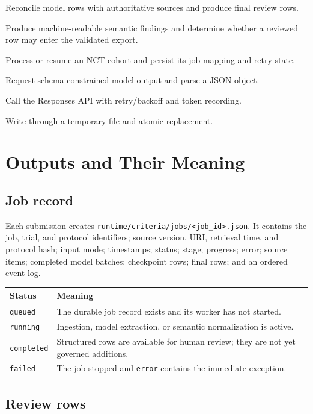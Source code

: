 \documentclass[11pt]{article}
\newcommand{\code}[1]{\nolinkurl{#1}}
\newcommand{\fn}[2]{\item[\code{#1}] #2}
\begin{document}
\begin{description}[style=nextline]
  \fn{normalize_rows()}{Reconcile model rows with authoritative sources and produce final review rows.}
  \fn{validate_criterion() / readiness()}{Produce machine-readable semantic findings and determine whether a reviewed row may enter the validated export.}
  \fn{run_manifest()}{Process or resume an NCT cohort and persist its job mapping and retry state.}
  \fn{StructuredJsonAdapter.generate_json()}{Request schema-constrained model output and parse a JSON object.}
  \fn{OpenAIProvider.generate()}{Call the Responses API with retry/backoff and token recording.}
  \fn{atomic_write_json()}{Write through a temporary file and atomic replacement.}
\end{description}

\section{Outputs and Their Meaning}

\subsection{Job record}

Each submission creates \code{runtime/criteria/jobs/<job_id>.json}. It contains the job, trial, and protocol identifiers; source version, URI, retrieval time, and protocol hash; input mode; timestamps; status; stage; progress; error; source items; completed model batches; checkpoint rows; final rows; and an ordered event log.

\begin{longtable}{p{}p{}}
\toprule
Status & Meaning \\
\midrule
\endhead
\code{queued} & The durable job record exists and its worker has not started. \\
\code{running} & Ingestion, model extraction, or semantic normalization is active. \\
\code{completed} & Structured rows are available for human review; they are not yet governed additions. \\
\code{failed} & The job stopped and \code{error} contains the immediate exception. \\
\bottomrule
\end{longtable}

\subsection{Review rows}
\end{document}
